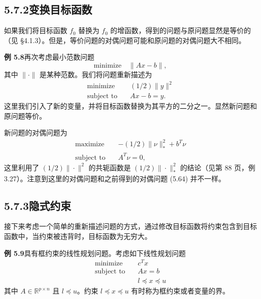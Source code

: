 \documentclass[UTF8, 12pt, fontset=fandol, oneside]{ctexart}
\begin{document}
\subsection*{5.7.2\quad 变换目标函数}

如果我们将目标函数 $f_0$ 替换为 $f_0$ 的增函数，得到的问题与原问题显然是等价的（见 §4.1.3）。但是，等价问题的对偶问题可能和原问题的对偶问题大不相同。

\noindent\textbf{例 5.8}\quad 再次考虑最小范数问题
\[
\text{minimize}\quad \|Ax-b\|,
\]
其中 $\|\cdot\|$ 是某种范数。我们将问题重新描述为
\[
\begin{aligned}
\text{minimize}\quad & (1/2)\|y\|^2\\
\text{subject to}\quad & Ax-b=y.
\end{aligned}
\]
这里我们引入了新的变量，并将目标函数替换为其平方的二分之一。显然新问题和原问题等价。

新问题的对偶问题为
\[
\begin{aligned}
\text{maximize}\quad & -(1/2)\|\nu\|_\ast^2+b^T\nu\\
\text{subject to}\quad & A^T\nu=0,
\end{aligned}
\]
这里利用了 $(1/2)\|\cdot\|^2$ 的共轭函数是 $(1/2)\|\cdot\|_\ast^2$ 的结论（见第 88 页，例 3.27）。注意到这里的对偶问题和之前得到的对偶问题 (5.64) 并不一样。

\subsection*{5.7.3\quad 隐式约束}

接下来考虑一个简单的重新描述问题的方式，通过修改目标函数将约束包含到目标函数中，当约束被违背时，目标函数为无穷大。

\noindent\textbf{例 5.9}\quad 具有框约束的线性规划问题。考虑如下线性规划问题
\begin{equation}
\begin{aligned}
\text{minimize}\quad & c^Tx\\
\text{subject to}\quad & Ax=b\\
& l\preceq x\preceq u
\end{aligned}
\tag{5.68}
\end{equation}
其中 $A\in\mathbb{R}^{p\times n}$ 且 $l\preceq u$。约束 $l\preceq x\preceq u$ 有时称为框约束或者变量的界。
\end{document}
